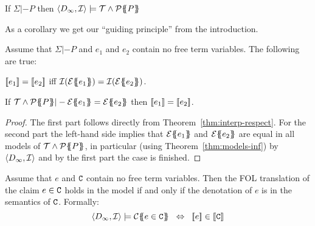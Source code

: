 \begin{theorem}\label{thm:models-inf}
If $\Sigma |- P$ then $\langle D_{\infty},{\cal I}\rangle \models {\cal T} \land {\cal P}\{\!\!\{P\}\!\!\}$
\end{theorem}
As a corollary we get our ``guiding principle'' from the introduction.
\begin{corollary}\label{cor:guiding-principle}
Assume that $\Sigma |- P$ and $e_1$ and $e_2$ contain no free term variables. The following
are true:
\begin{itemize*}
  \item $[\![e_1]\!] = [\![e_2]\!]$ iff ${\cal I}(\etrans{}{}{e_1}) = {\cal I}(\etrans{}{}{e_2})$.
  \item If $\Th \land \ptrans{\Sigma}{P} |- \etrans{}{}{e_1} = \etrans{}{}{e_2}$ then $[\![e_1]\!] = [\![e_2]\!]$.
\end{itemize*}
\end{corollary}
\begin{proof} The first part follows directly from Theorem~\ref{thm:interp-respect}.
For the second part the left-hand side implies that ${\cal E}\{\!\!\{e_1\}\!\!\}$ and ${\cal E}\{\!\!\{e_2\}\!\!\}$ are
equal in all models of ${\cal T} \land {\cal P}\{\!\!\{P\}\!\!\}$, in particular (using Theorem~\ref{thm:models-inf})
by $\langle D_{\infty},{\cal I}\rangle$ and by the first part the case is finished.
\end{proof}


\begin{theorem}\label{thm:den-contr-satisfaction} Assume that $e$ and ${\tt C}$ contain no free
term variables. Then the FOL translation of the claim $e \in {\tt C}$ holds in the model
if and only if the denotation of $e$ is in the semantics of ${\tt C}$.  Formally:
$$\langle D_\infty,{\cal I}\rangle \models \ctrans{}{\cdot}{e \in \Ct}
  \;\; \Leftrightarrow \;\; \dbrace{e} \in \dbrace{\Ct}
$$
\end{theorem}


